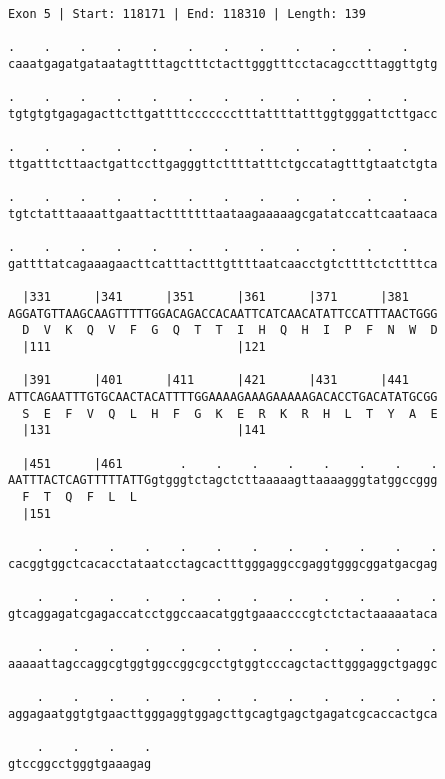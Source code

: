 \documentclass{article}
\begin{document}
\begin{Verbatim}[fontfamily=courier]
Exon 5 | Start: 118171 | End: 118310 | Length: 139

.    .    .    .    .    .    .    .    .    .    .    .    
caaatgagatgataatagttttagctttctacttgggtttcctacagcctttaggttgtg

.    .    .    .    .    .    .    .    .    .    .    .    
tgtgtgtgagagacttcttgattttccccccctttattttatttggtgggattcttgacc

.    .    .    .    .    .    .    .    .    .    .    .    
ttgatttcttaactgattccttgagggttcttttatttctgccatagtttgtaatctgta

.    .    .    .    .    .    .    .    .    .    .    .    
tgtctatttaaaattgaattactttttttaataagaaaaagcgatatccattcaataaca

.    .    .    .    .    .    .    .    .    .    .    .    
gattttatcagaaagaacttcatttactttgttttaatcaacctgtcttttctcttttca

  |331      |341      |351      |361      |371      |381    
AGGATGTTAAGCAAGTTTTTGGACAGACCACAATTCATCAACATATTCCATTTAACTGGG
  D  V  K  Q  V  F  G  Q  T  T  I  H  Q  H  I  P  F  N  W  D
  |111                          |121                        

  |391      |401      |411      |421      |431      |441    
ATTCAGAATTTGTGCAACTACATTTTGGAAAAGAAAGAAAAAGACACCTGACATATGCGG
  S  E  F  V  Q  L  H  F  G  K  E  R  K  R  H  L  T  Y  A  E
  |131                          |141                        

  |451      |461        .    .    .    .    .    .    .    .
AATTTACTCAGTTTTTATTGgtgggtctagctcttaaaaagttaaaagggtatggccggg
  F  T  Q  F  L  L                                          
  |151                                                      

    .    .    .    .    .    .    .    .    .    .    .    .
cacggtggctcacacctataatcctagcactttgggaggccgaggtgggcggatgacgag

    .    .    .    .    .    .    .    .    .    .    .    .
gtcaggagatcgagaccatcctggccaacatggtgaaaccccgtctctactaaaaataca

    .    .    .    .    .    .    .    .    .    .    .    .
aaaaattagccaggcgtggtggccggcgcctgtggtcccagctacttgggaggctgaggc

    .    .    .    .    .    .    .    .    .    .    .    .
aggagaatggtgtgaacttgggaggtggagcttgcagtgagctgagatcgcaccactgca

    .    .    .    .
gtccggcctgggtgaaagag
\end{Verbatim}
\newpage
\end{document}
